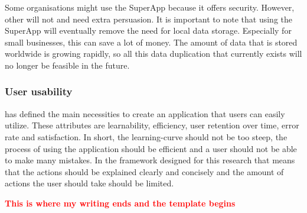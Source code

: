 Some organisations might use the SuperApp because it offers security. However, other will not and need extra persuasion. It is important to note that using the SuperApp will eventually remove the need for local data storage. Especially for small businesses, this can save a lot of money. The amount of data that is stored worldwide is growing rapidly, so all this data duplication that currently exists will no longer be feasible in the future. 

\subsubsection{User usability}
\cite{usability} has defined the main necessities to create an application that users can easily utilize. These attributes are learnability, efficiency, user retention over time, error rate and satisfaction. In short, the learning-curve should not be too steep, the process of using the application should be efficient and a user should not be able to make many mistakes. In the framework designed for this research that means that the actions should be explained clearly and concisely and the amount of actions the user should take should be limited. 

\textbf{\textcolor{red}{This is where my writing ends and the template begins}}
